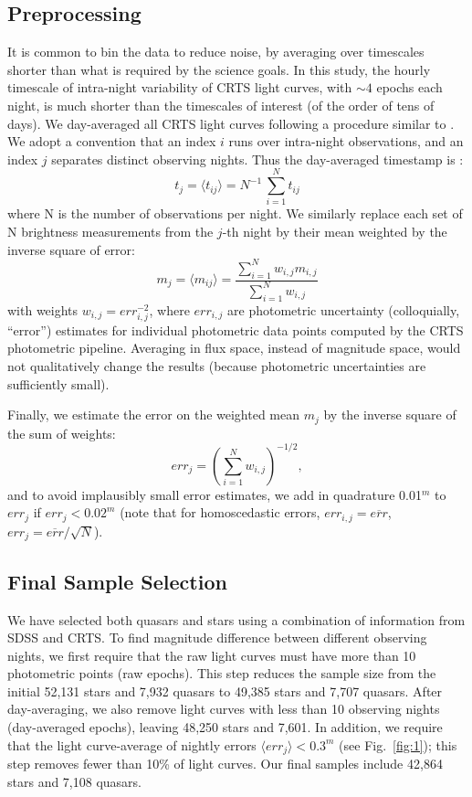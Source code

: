 \documentclass[fleqn,usenatbib]{mnras}
\begin{document}
\subsection{Preprocessing}
\label{sec:preprocessing}
It is common to bin the data to reduce noise, by averaging over timescales shorter than what is required by the science goals. In this study, the hourly timescale of intra-night variability of CRTS light curves, with $\sim4$ epochs each night, is much shorter than the timescales of interest (of the order of tens of days).  We day-averaged all CRTS light curves following a procedure similar to \cite{charisi2016}. We adopt a convention that an index  $i$ runs over intra-night observations, and an index $j$ separates distinct observing nights. Thus the day-averaged timestamp is : 
\begin{equation}
t_{j} = \langle t_{ij} \rangle =  N^{-1} \, \sum_{i=1}^{N}{ t_{ij} }
\end{equation}
where N is the number of observations per night. We similarly replace each set of N brightness measurements from the  $j$-th  night by their mean weighted by the inverse square of error:
\begin{equation}
\label{eq:1}
 m_{j} = \langle m_{ij} \rangle = \frac{\sum_{i=1}^{N} {w_{i,j} m_{i,j}} } {\sum_{i=1}^{N} {w_{i,j}} }
\end{equation}
with weights $w_{i,j} = err_{i,j}^{-2}$, where $err_{i,j}$ are photometric uncertainty (colloquially, ``error'') estimates
for individual photometric data points computed by the CRTS photometric pipeline. Averaging in 
flux space, instead of magnitude space, would not qualitatively change the results (because photometric 
uncertainties are sufficiently small). 

Finally, we estimate the error on the weighted mean $m_{j}$ by the inverse square of the sum of weights:  
\begin{equation}
\label{eq:2}
err_{j} = \left(\sum_{i=1}^{N} {w_{i,j}}\right)^{-1/2}, 
\end{equation} 
and to avoid implausibly small error estimates, we add in quadrature 0.01$^m$ to $err_{j}$ if $err_{j} < 0.02^m$
(note that for homoscedastic errors, $err_{i,j}=\overline{err}$, $err_j = \overline{err}/\sqrt{N}$). 


\subsection{Final Sample Selection}

We have selected both quasars and stars using a combination of information from SDSS and CRTS. 
To find magnitude difference between different observing nights, we first require that the raw light curves
must have more than 10 photometric points (raw epochs). This step reduces the sample size from the initial 52,131 stars and 7,932 
quasars to 49,385 stars and 7,707 quasars. After day-averaging, we also remove light curves with less than 10 
observing nights (day-averaged epochs), leaving 48,250 stars and 7,601. In addition, we require that the light curve-average 
of nightly errors $\langle err_{j} \rangle < 0.3^m$ (see Fig.~\ref{fig:1}); this step removes
fewer than 10\% of light curves. Our final samples include 42,864 stars and 7,108 quasars. 
\end{document}
